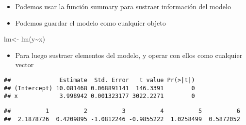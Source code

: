 \documentclass[
  ignorenonframetext,
]{beamer}
\newenvironment{Shaded}{\begin{snugshade}}{\end{snugshade}}
\newcommand{\FunctionTok}[1]{\textcolor[rgb]{0.00,0.00,0.00}{#1}}
\newcommand{\NormalTok}[1]{#1}
\newcommand{\OtherTok}[1]{\textcolor[rgb]{0.56,0.35,0.01}{#1}}
\newcommand{\SpecialCharTok}[1]{\textcolor[rgb]{0.00,0.00,0.00}{#1}}
\providecommand{\tightlist}{%
  \setlength{\itemsep}{0pt}\setlength{\parskip}{0pt}}
\begin{document}
\begin{frame}[fragile]{}
\protect\hypertarget{section-8}{}
\begin{itemize}
\tightlist
\item
  Podemos usar la función summary para sustraer información del modelo
\item
  Podemos guardar el modelo como cualquier objeto
\end{itemize}

\begin{Shaded}
\begin{Highlighting}[]
\NormalTok{lm}\OtherTok{\textless{}{-}} \FunctionTok{lm}\NormalTok{(y}\SpecialCharTok{\textasciitilde{}}\NormalTok{x)}
\end{Highlighting}
\end{Shaded}

\begin{itemize}
\tightlist
\item
  Para luego sustraer elementos del modelo, y operar con ellos como
  cualquier vector
\end{itemize}

\begin{Shaded}
\end{Shaded}

\begin{verbatim}
##              Estimate  Std. Error   t value Pr(>|t|)
## (Intercept) 10.081468 0.068891141  146.3391        0
## x            3.998942 0.001323177 3022.2271        0
\end{verbatim}

\begin{Shaded}
\end{Shaded}

\begin{verbatim}
##          1          2          3          4          5          6 
##  2.1878726  0.4209895 -1.0812246 -0.9855222  1.0258499  0.5872052
\end{verbatim}
\end{frame}
\end{document}
